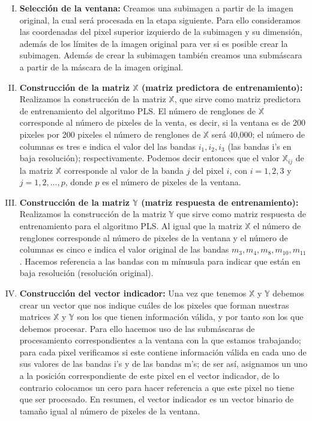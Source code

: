\begin{enumerate}[I)]
\item \textbf{Selección de la ventana: }  Creamos una subimagen a partir de la imagen original, la cual será procesada en la etapa siguiente. Para ello consideramos las coordenadas del pixel superior izquierdo de la subimagen y su dimensión, además de los límites de la imagen original para ver si es posible crear la subimagen. Además de crear la subimagen también creamos una submáscara a partir de la máscara de la imagen original.
\item \textbf{Construcción de la matriz $\mathbb{X}$ (matriz predictora de entrenamiento):  } Realizamos la construcción de la matriz $\mathbb{X}$, que sirve como matriz predictora de entrenamiento del algoritmo PLS. El número de renglones  de $\mathbb{X}$ corresponde al número de pixeles de la venta, es decir, si la ventana es de 200 pixeles por 200 pixeles el número de  renglones de $\mathbb{X}$ será 40,000; el número de columnas es tres e indica el valor del las bandas $i_{1}, i_{2}, i_{3}$ (las bandas i's en baja resolución);  respectivamente. Podemos decir entonces que el valor $\mathbb{X}_{ij}$ de la matriz $\mathbb{X}$ corresponde al valor de la banda $j$ del pixel $i$, con $i = 1,2,3$ y $j = 1, 2, ..., p$, donde $p$ es el número de pixeles de la ventana.     
\item \textbf{Construcción de la matriz $\mathbb{Y}$ (matriz respuesta de entrenamiento): 
} Realizamos la construcción de la matriz $\mathbb{Y}$ que sirve como matriz respuesta de entrenamiento para el algoritmo PLS. Al igual que la matriz $\mathbb{X}$ el número de renglones corresponde al número de pixeles de la ventana y el número de columnas es cinco e indica el valor original de las bandas $m_{3}, m_{4}, m_{8}, m_{10}, m_{11}$. Hacemos referencia a las bandas con m mínusula para indicar que están en baja resolución (resolución original).
\item \textbf{Construcción del vector indicador:} Una vez que tenemos $\mathbb{X}$ y $\mathbb{Y}$ debemos crear un vector que nos indique cuáles de los pixeles que forman nuestras matrices  $\mathbb{X}$ y $\mathbb{Y}$ son los que tienen información válida, y por tanto son los que debemos procesar. Para ello hacemos uso de las submáscaras de procesamiento correspondientes a la ventana con la que estamos trabajando; para cada pixel verificamos si este contiene información válida en cada uno de sus valores de las bandas i's y de las bandas m's; de ser así, asignamos un uno a la posición correspondiente de este pixel en el vector indicador, de lo contrario colocamos un cero para hacer referencia a que este pixel no tiene que ser procesado. En resumen, el vector indicador es un vector binario de tamaño igual al número de pixeles de la ventana.

\end{enumerate}
